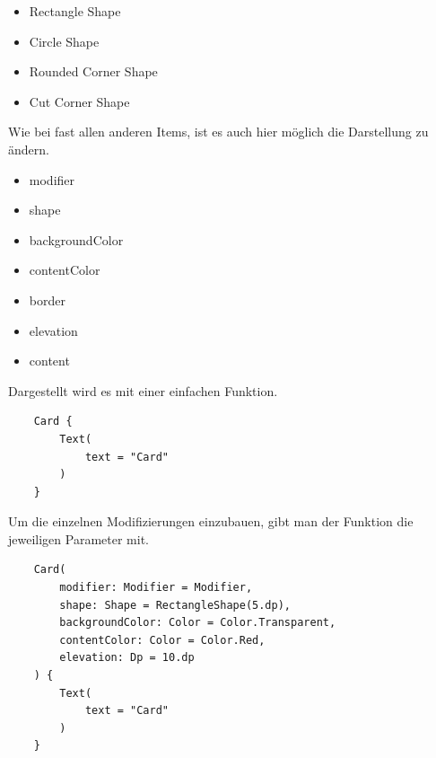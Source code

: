 \begin{itemize}
    \item Rectangle Shape
    \item Circle Shape
    \item Rounded Corner Shape
    \item Cut Corner Shape
\end{itemize}

Wie bei fast allen anderen Items, ist es auch hier möglich die Darstellung zu ändern.

\begin{itemize}
   \item modifier
   \item shape
   \item backgroundColor
   \item contentColor
   \item border
   \item elevation
   \item content
\end{itemize}

Dargestellt wird es mit einer einfachen Funktion.


\begin{lstlisting}
    Card {
        Text(
            text = "Card"
        )
    }
\end{lstlisting}

Um die einzelnen Modifizierungen einzubauen, gibt man der Funktion die jeweiligen Parameter mit.

\begin{lstlisting}
    Card(
        modifier: Modifier = Modifier,
        shape: Shape = RectangleShape(5.dp),
        backgroundColor: Color = Color.Transparent,
        contentColor: Color = Color.Red,
        elevation: Dp = 10.dp
    ) {
        Text(
            text = "Card"
        )
    }
\end{lstlisting}





